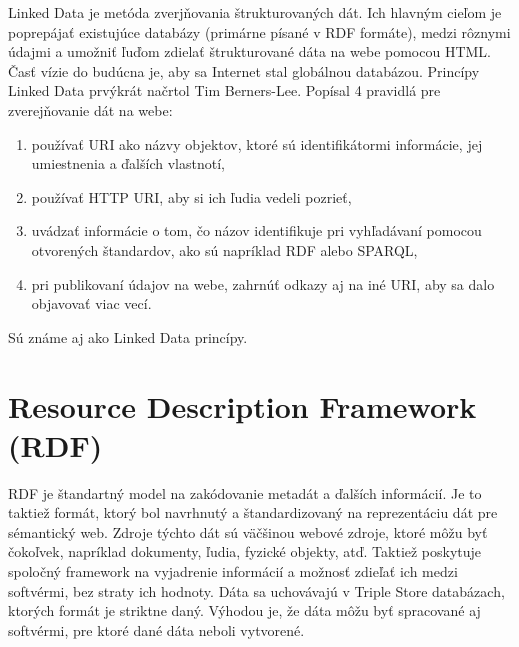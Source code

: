 \documentclass[12pt, a4paper, oneside]{book}
\begin{document}
Linked Data \cite{linkeddata} je metóda zverjňovania štrukturovaných dát. Ich hlavným cieľom je poprepájať existujúce databázy (primárne písané v RDF formáte), medzi rôznymi údajmi a umožniť ľuďom zdielať štrukturované dáta na webe pomocou HTML. Časť vízie do budúcna je, aby sa Internet stal globálnou databázou. Princípy Linked Data prvýkrát načrtol Tim Berners-Lee. Popísal 4 pravidlá pre zverejňovanie dát na webe:
\begin{enumerate}
  \item používať URI ako názvy objektov, ktoré sú identifikátormi informácie, jej umiestnenia a ďalších vlastnotí,
  \item používať HTTP URI, aby si ich ľudia vedeli pozrieť,
  \item uvádzať informácie o tom, čo názov identifikuje pri vyhľadávaní pomocou otvorených štandardov, ako sú napríklad RDF alebo SPARQL,
  \item pri publikovaní údajov na webe, zahrnúť odkazy aj na iné URI, aby sa dalo objavovať viac vecí.
\end{enumerate}
Sú známe aj ako Linked Data princípy.



\section{Resource Description Framework (RDF)}

RDF \cite{rdf} je štandartný model na zakódovanie metadát a ďalších informácií. Je to taktiež formát, ktorý bol navrhnutý a štandardizovaný na reprezentáciu dát pre sémantický web. Zdroje týchto dát sú väčšinou webové zdroje, ktoré môžu byť čokoľvek, napríklad dokumenty, ľudia, fyzické objekty, atď. Taktiež poskytuje spoločný framework na vyjadrenie informácií a možnosť zdieľať ich medzi softvérmi, bez straty ich hodnoty. Dáta sa uchovávajú v Triple Store databázach, ktorých formát je striktne daný. Výhodou je, že dáta môžu byť spracované aj softvérmi, pre ktoré dané dáta neboli vytvorené.

\end{document}
